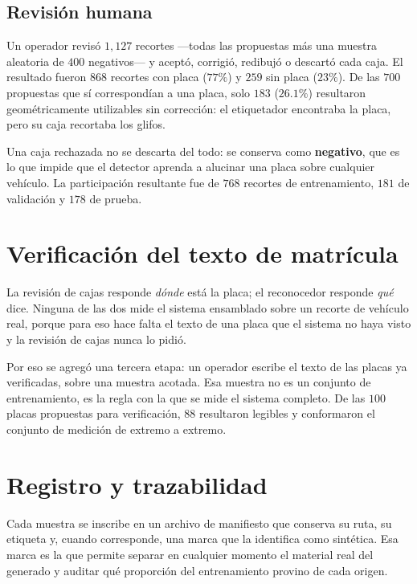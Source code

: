 \subsection{Revisión humana}

Un operador revisó $1{,}127$ recortes ---todas las propuestas más una muestra
aleatoria de $400$ negativos--- y aceptó, corrigió, redibujó o descartó cada caja.
El resultado fueron $868$ recortes con placa ($77\%$) y $259$ sin placa
($23\%$). De las $700$ propuestas que sí correspondían a una placa, solo $183$
($26{.}1\%$) resultaron geométricamente utilizables sin corrección: el
etiquetador encontraba la placa, pero su caja recortaba los glifos.

Una caja rechazada no se descarta del todo: se conserva como \textbf{negativo},
que es lo que impide que el detector aprenda a alucinar una placa sobre cualquier
vehículo. La participación resultante fue de $768$ recortes de entrenamiento, $181$
de validación y $178$ de prueba.

\section{Verificación del texto de matrícula}

La revisión de cajas responde \emph{dónde} está la placa; el reconocedor responde
\emph{qué} dice. Ninguna de las dos mide el sistema ensamblado sobre un recorte de
vehículo real, porque para eso hace falta el texto de una placa que el sistema no
haya visto y la revisión de cajas nunca lo pidió.

Por eso se agregó una tercera etapa: un operador escribe el texto de las placas ya
verificadas, sobre una muestra acotada. Esa muestra no es un conjunto de
entrenamiento, es la regla con la que se mide el sistema completo. De las $100$
placas propuestas para verificación, $88$ resultaron legibles y conformaron el
conjunto de medición de extremo a extremo.

\section{Registro y trazabilidad}

Cada muestra se inscribe en un archivo de manifiesto que conserva su ruta, su
etiqueta y, cuando corresponde, una marca que la identifica como sintética. Esa
marca es la que permite separar en cualquier momento el material real del generado
y auditar qué proporción del entrenamiento provino de cada origen.

